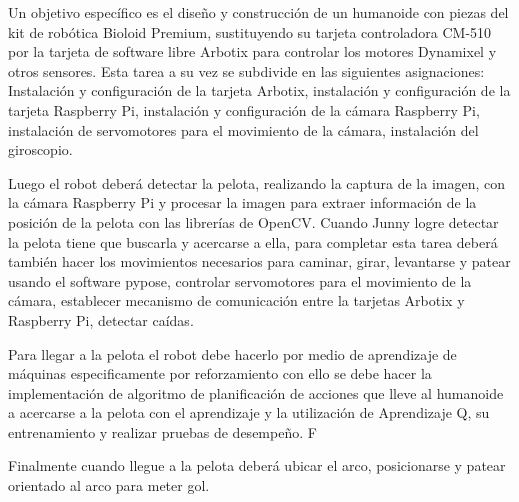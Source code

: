 Un objetivo espec\'ifico es el diseño y construcción de un humanoide con piezas del kit de robótica Bioloid Premium, sustituyendo su tarjeta controladora CM-510 \cite{cm510} por la tarjeta de software libre Arbotix para controlar los motores Dynamixel y otros sensores. Esta tarea a su vez se subdivide en las siguientes asignaciones: Instalación y configuración de la tarjeta Arbotix, instalación y configuración de la tarjeta Raspberry Pi, instalación y configuración de la cámara Raspberry Pi, instalación de servomotores  para el movimiento de la cámara, instalación del giroscopio. 

Luego el robot deber\'a detectar la pelota, realizando la captura de la imagen, con la cámara Raspberry Pi y procesar la imagen para extraer información de la posición de la pelota con las librerías de OpenCV. Cuando Junny logre detectar la pelota tiene que buscarla y acercarse a ella, para completar esta tarea deber\'a tambi\'en hacer los movimientos necesarios para caminar, girar, levantarse y patear usando el software pypose, controlar servomotores para el movimiento de la cámara, establecer mecanismo de comunicación entre la tarjetas Arbotix y Raspberry Pi, detectar ca\'idas. 

Para llegar a la pelota el robot debe hacerlo por medio de aprendizaje de m\'aquinas especificamente por reforzamiento con ello se debe hacer la implementación de algoritmo de planificación de acciones que lleve al humanoide a acercarse a la pelota con el aprendizaje y la utilizaci\'on de Aprendizaje Q, su entrenamiento y realizar pruebas de desempe\~no. F

Finalmente cuando llegue a la pelota deber\'a ubicar el arco, posicionarse y patear orientado al arco para meter gol. 
    


